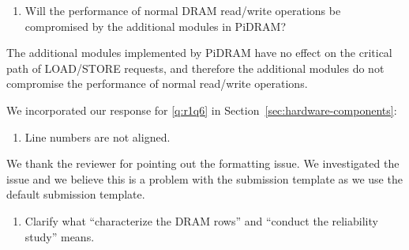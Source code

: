 
\vspace{5pt}
\yyboxbegin 
\yyboxend 

\newpage

\bigbreak
\begin{tcolorbox}
    \begin{enumerate}[label=R1/\arabic*]
        \addtocounter{enumi}{5}
        \item \label{q:r1q6} Will the performance of normal DRAM read/write operations be compromised by the additional modules in PiDRAM?
    \end{enumerate}
\end{tcolorbox} 

The additional modules implemented by PiDRAM have no effect on the critical path of LOAD/STORE requests, and therefore the additional modules do not compromise the performance of normal read/write operations. 

We incorporated our response for \ref{q:r1q6} in Section~\ref{sec:hardware-components}:

\vspace{5pt}
\yyboxbegin 
\yyboxend 

\bigbreak
\begin{tcolorbox}
    \begin{enumerate}[label=R1/\arabic*]
        \addtocounter{enumi}{6}
        \item \label{q:r1q7} Line numbers are not aligned.
    \end{enumerate}
\end{tcolorbox} 

We thank the reviewer for pointing out the formatting issue. We investigated the issue and we believe this is a problem with the submission template as we use the default submission template.

\newpage

\begin{center}
    {\Large {}}
\end{center}


\begin{tcolorbox}
    \begin{enumerate}[label=R2/\arabic*]
        \item \label{q:r2q1} Clarify what ``characterize the DRAM rows'' and ``conduct the reliability study'' means. 
    \end{enumerate}
\end{tcolorbox} 

